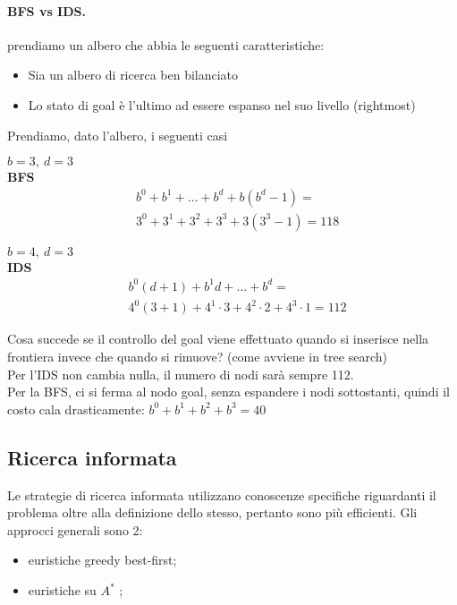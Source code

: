 \documentclass[a4paper, 11pt]{article}
\newcommand{\astar}{$A^\ast$ }
\begin{document}
	\paragraph{BFS vs IDS.} prendiamo un albero che abbia le seguenti caratteristiche:
	\begin{itemize}
		\item Sia un albero di ricerca ben bilanciato
		\item Lo stato di goal è l'ultimo ad essere espanso nel suo livello (rightmost)
	\end{itemize}
	Prendiamo, dato l'albero, i seguenti casi
	\begin{multicols}{2}
		\noindent
		$ b = 3,\ d = 3 $ \\
		\textbf{BFS}
		\begin{align*}
			& b^0 + b^1 + \dots + b^d + b(b^d - 1) =\\
			& 3^0 + 3^1 + 3^2 + 3^3 + 3(3^3 -1) = 118
		\end{align*}
		\columnbreak
		
		\noindent
		$ b = 4,\ d = 3 $ \\
		\textbf{IDS}\vspace*{-9pt}
		\begin{align*}
			& b^0(d + 1) + b^1d + \dots + b^d =\\
			& 4^0(3 + 1) + 4^1\cdot 3 + 4^2\cdot 2 + 4^3\cdot 1 = 112
		\end{align*}
	\end{multicols}
	
	Cosa succede se il controllo del goal viene effettuato quando si inserisce nella frontiera invece che quando si rimuove? (come avviene in tree search)\\
	Per l'IDS non cambia nulla, il numero di nodi sarà sempre 112.\\
	Per la BFS, ci si ferma al nodo goal, senza espandere i nodi sottostanti, quindi il costo cala drasticamente: $ b^0 + b^1 + b^2 + b^3 = 40 $

\subsection{Ricerca informata}
Le strategie di ricerca informata utilizzano conoscenze specifiche riguardanti il problema oltre alla definizione dello stesso, pertanto sono più efficienti.
Gli approcci generali sono 2: \begin{itemize}
	\item euristiche greedy best-first;
	\item euristiche su \astar;
\end{itemize}
\end{document}
